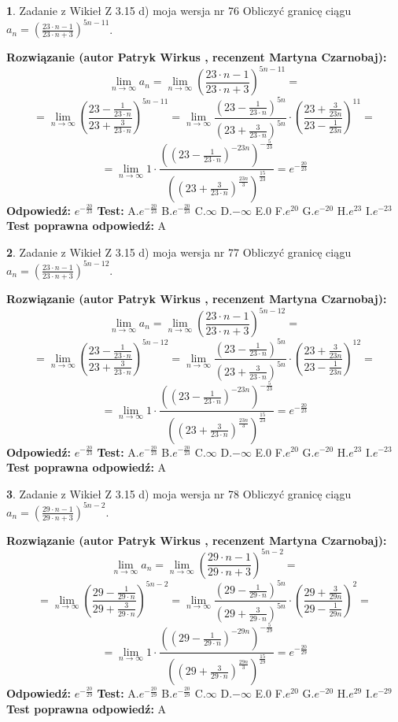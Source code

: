 \documentclass[12pt, a4paper]{article}
\theoremstyle{definition} %
\newtheorem{zad}{}
\newcommand{\zadStart}[1]{\begin{zad}#1\newline}
\newcommand{\zadStop}{\end{zad}}
\newcommand{\rozwStart}[2]{\noindent \textbf{Rozwiązanie (autor #1 , recenzent #2): }\newline}
\newcommand{\rozwStop}{\newline}
\newcommand{\odpStart}{\noindent \textbf{Odpowiedź:}\newline}
\newcommand{\odpStop}{\newline}
\newcommand{\testStart}{\noindent \textbf{Test:}\newline}
\newcommand{\testStop}{\newline}
\newcommand{\kluczStart}{\noindent \textbf{Test poprawna odpowiedź:}\newline}
\newcommand{\kluczStop}{\newline}
\begin{document}
\zadStart{Zadanie z Wikieł Z 3.15 d) moja wersja nr 76}
Obliczyć granicę ciągu $a_{n}=(\frac{23\cdot n - 1}{23 \cdot n + 3})^{5n-11}$.
\zadStop
\rozwStart{Patryk Wirkus}{Martyna Czarnobaj}
$$\lim\limits_{n\to\infty} a_{n} = \lim\limits_{n\to\infty}(\frac{23\cdot n - 1}{23 \cdot n + 3})^{5n-11}=$$
$$=\lim\limits_{n\to\infty}(\frac{23 - \frac{1}{23\cdot n}}{23 + \frac{3}{23 \cdot n}})^{5n-11}=\lim\limits_{n\to\infty}\frac{(23 - \frac{1}{23\cdot n})^{5n}}{(23 + \frac{3}{23\cdot n})^{5n}} \cdot (\frac{23+\frac{3}{23n}}{23-\frac{1}{23n}})^{11}=$$
$$=\lim\limits_{n\to\infty} 1 \cdot \frac{((23-\frac{1}{23 \cdot n})^{-23n})^{-\frac{5}{23}}}{((23+\frac{3}{23 \cdot n})^{\frac{23n}{3}})^{\frac{15}{23}}} =e^{-\frac{20}{23}}$$
\rozwStop
\odpStart
$e^{-\frac{20}{23}}$
\odpStop
\testStart
A.$ e^{-\frac{20}{23}}$
B.$ e^{-\frac{20}{23}}$
C.$\infty$
D.$-\infty$
E.$0$
F.$e^{20}$
G.$e^{-20}$
H.$e^{23}$
I.$e^{-23}$
\testStop
\kluczStart
A
\kluczStop



\zadStart{Zadanie z Wikieł Z 3.15 d) moja wersja nr 77}
Obliczyć granicę ciągu $a_{n}=(\frac{23\cdot n - 1}{23 \cdot n + 3})^{5n-12}$.
\zadStop
\rozwStart{Patryk Wirkus}{Martyna Czarnobaj}
$$\lim\limits_{n\to\infty} a_{n} = \lim\limits_{n\to\infty}(\frac{23\cdot n - 1}{23 \cdot n + 3})^{5n-12}=$$
$$=\lim\limits_{n\to\infty}(\frac{23 - \frac{1}{23\cdot n}}{23 + \frac{3}{23 \cdot n}})^{5n-12}=\lim\limits_{n\to\infty}\frac{(23 - \frac{1}{23\cdot n})^{5n}}{(23 + \frac{3}{23\cdot n})^{5n}} \cdot (\frac{23+\frac{3}{23n}}{23-\frac{1}{23n}})^{12}=$$
$$=\lim\limits_{n\to\infty} 1 \cdot \frac{((23-\frac{1}{23 \cdot n})^{-23n})^{-\frac{5}{23}}}{((23+\frac{3}{23 \cdot n})^{\frac{23n}{3}})^{\frac{15}{23}}} =e^{-\frac{20}{23}}$$
\rozwStop
\odpStart
$e^{-\frac{20}{23}}$
\odpStop
\testStart
A.$ e^{-\frac{20}{23}}$
B.$ e^{-\frac{20}{23}}$
C.$\infty$
D.$-\infty$
E.$0$
F.$e^{20}$
G.$e^{-20}$
H.$e^{23}$
I.$e^{-23}$
\testStop
\kluczStart
A
\kluczStop



\zadStart{Zadanie z Wikieł Z 3.15 d) moja wersja nr 78}
Obliczyć granicę ciągu $a_{n}=(\frac{29\cdot n - 1}{29 \cdot n + 3})^{5n-2}$.
\zadStop
\rozwStart{Patryk Wirkus}{Martyna Czarnobaj}
$$\lim\limits_{n\to\infty} a_{n} = \lim\limits_{n\to\infty}(\frac{29\cdot n - 1}{29 \cdot n + 3})^{5n-2}=$$
$$=\lim\limits_{n\to\infty}(\frac{29 - \frac{1}{29\cdot n}}{29 + \frac{3}{29 \cdot n}})^{5n-2}=\lim\limits_{n\to\infty}\frac{(29 - \frac{1}{29\cdot n})^{5n}}{(29 + \frac{3}{29\cdot n})^{5n}} \cdot (\frac{29+\frac{3}{29n}}{29-\frac{1}{29n}})^{2}=$$
$$=\lim\limits_{n\to\infty} 1 \cdot \frac{((29-\frac{1}{29 \cdot n})^{-29n})^{-\frac{5}{29}}}{((29+\frac{3}{29 \cdot n})^{\frac{29n}{3}})^{\frac{15}{29}}} =e^{-\frac{20}{29}}$$
\rozwStop
\odpStart
$e^{-\frac{20}{29}}$
\odpStop
\testStart
A.$ e^{-\frac{20}{29}}$
B.$ e^{-\frac{20}{29}}$
C.$\infty$
D.$-\infty$
E.$0$
F.$e^{20}$
G.$e^{-20}$
H.$e^{29}$
I.$e^{-29}$
\testStop
\kluczStart
A
\kluczStop
\end{document}
